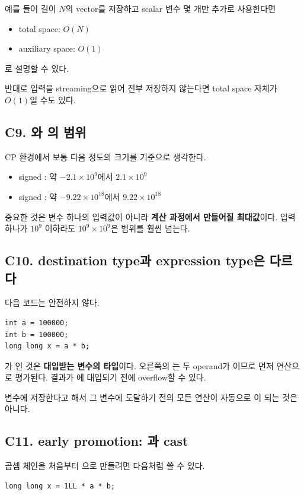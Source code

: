 예를 들어 길이 $N$의 vector를 저장하고 scalar 변수 몇 개만 추가로 사용한다면
\begin{itemize}
  \item total space: $O(N)$
  \item auxiliary space: $O(1)$
\end{itemize}
로 설명할 수 있다.

반대로 입력을 streaming으로 읽어 전부 저장하지 않는다면 total space 자체가 $O(1)$일 수도 있다.

\subsection{C9. 와 의 범위}
CP 환경에서 보통 다음 정도의 크기를 기준으로 생각한다.
\begin{itemize}
  \item signed : 약 $-2.1\times10^9$에서 $2.1\times10^9$
  \item signed : 약 $-9.22\times10^{18}$에서 $9.22\times10^{18}$
\end{itemize}

중요한 것은 변수 하나의 입력값이 아니라 \textbf{계산 과정에서 만들어질 최대값}이다. 입력 하나가 $10^9$ 이하라도 $10^9\times10^9$은  범위를 훨씬 넘는다.

\subsection{C10. destination type과 expression type은 다르다}
다음 코드는 안전하지 않다.
\begin{lstlisting}
int a = 100000;
int b = 100000;
long long x = a * b;
\end{lstlisting}

가 인 것은 \textbf{대입받는 변수의 타입}이다. 오른쪽의 는 두 operand가 이므로 먼저  연산으로 평가된다. 결과가 에 대입되기 전에 overflow할 수 있다.

\begin{keybox}[기억할 문장]
 변수에 저장한다고 해서 그 변수에 도달하기 전의 모든 연산이 자동으로 이 되는 것은 아니다.
\end{keybox}

\subsection{C11. early promotion: 과 cast}
곱셈 체인을 처음부터 으로 만들려면 다음처럼 쓸 수 있다.
\begin{lstlisting}
long long x = 1LL * a * b;
\end{lstlisting}

